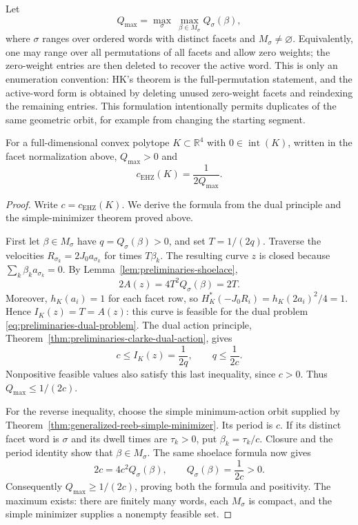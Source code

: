 Let
\[
  Q_{\max}
  =
  \max_\sigma\ \max_{\beta\in M_\sigma} Q_\sigma(\beta),
\]
where \(\sigma\) ranges over ordered words with distinct facets and
\(M_\sigma\ne\varnothing\). Equivalently,
one may range over all permutations of all facets and allow zero weights; the
zero-weight entries are then deleted to recover the active word. This is only
an enumeration convention: HK's theorem is the full-permutation statement, and
the active-word form is obtained by deleting unused zero-weight facets and
reindexing the remaining entries. This formulation intentionally permits
duplicates of the same geometric orbit, for example from changing the starting
segment.

\begin{theorem}
\label{thm:quadratic-program-algorithm-hk2019-hk-formula}
For a full-dimensional convex polytope \(K\subset\mathbb{R}^4\) with
\(0\in\operatorname{int}(K)\), written in the facet normalization above,
\(Q_{\max}>0\) and
\[
  c_{\mathrm{EHZ}}(K)=\frac{1}{2Q_{\max}}.
\]
\end{theorem}

\begin{proof}
Write \(c=c_{\mathrm{EHZ}}(K)\). We derive the formula from the dual
principle and the simple-minimizer theorem proved above.

First let \(\beta\in M_\sigma\) have \(q=Q_\sigma(\beta)>0\), and set
\(T=1/(2q)\). Traverse the velocities \(R_{\sigma_k}=2J_0a_{\sigma_k}\)
for times \(T\beta_k\). The resulting curve \(z\) is closed because
\(\sum_k\beta_k a_{\sigma_k}=0\). By
Lemma~\ref{lem:preliminaries-shoelace},
\[
  2A(z)=4T^2Q_\sigma(\beta)=2T.
\]
Moreover, \(h_K(a_i)=1\) for each facet row, so
\(H_K^*(-J_0R_i)=h_K(2a_i)^2/4=1\). Hence \(I_K(z)=T=A(z)\):
this curve is feasible for the dual problem
\eqref{eq:preliminaries-dual-problem}. The dual action principle,
Theorem~\ref{thm:preliminaries-clarke-dual-action}, gives
\[
  c\leq I_K(z)=\frac1{2q},\qquad q\leq\frac1{2c}.
\]
Nonpositive feasible values also satisfy this last inequality, since \(c>0\).
Thus \(Q_{\max}\leq1/(2c)\).

For the reverse inequality, choose the simple minimum-action orbit supplied
by Theorem~\ref{thm:generalized-reeb-simple-minimizer}. Its period is \(c\).
If its distinct facet word is \(\sigma\) and its dwell times are
\(\tau_k>0\), put \(\beta_k=\tau_k/c\). Closure and the period identity
show that \(\beta\in M_\sigma\). The same shoelace formula now gives
\[
  2c=4c^2Q_\sigma(\beta),\qquad
  Q_\sigma(\beta)=\frac1{2c}>0.
\]
Consequently \(Q_{\max}\geq1/(2c)\), proving both the formula and positivity.
The maximum exists: there are finitely many words, each \(M_\sigma\) is
compact, and the simple minimizer supplies a nonempty feasible set.
\end{proof}

